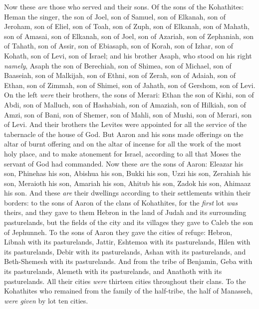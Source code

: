 \begin{biblechapter}
\verse Now these \textit{are} those who served and their sons. Of the sons of the Kohathites: Heman the singer, the son of Joel, son of Samuel,
\verse son of Elkanah, son of Jeroham, son of Eliel, son of Toah,
\verse son of Zuph, son of Elkanah, son of Mahath, son of Amasai,
\verse son of Elkanah, son of Joel, son of Azariah, son of Zephaniah,
\verse son of Tahath, son of Assir, son of Ebiasaph, son of Korah,
\verse son of Izhar, son of Kohath, son of Levi, son of Israel;
\verse and his brother Asaph, who stood on his right \textit{namely}, Asaph the son of Berechiah, son of Shimea,
\verse son of Michael, son of Baaseiah, son of Malkijah,
\verse son of Ethni, son of Zerah, son of Adaiah,
\verse son of Ethan, son of Zimmah, son of Shimei,
\verse son of Jahath, son of Gershom, son of Levi.
\verse On the left \textit{were} their brothers, the sons of Merari: Ethan the son of Kishi, son of Abdi, son of Malluch,
\verse son of Hashabiah, son of Amaziah, son of Hilkiah,
\verse son of Amzi, son of Bani, son of Shemer,
\verse son of Mahli, son of Mushi, son of Merari, son of Levi.
\verse And their brothers the Levites were appointed for all the service of the tabernacle of the house of God.
\verse But Aaron and his sons made offerings on the altar of burnt offering and on the altar of incense for all the work of the most holy place, and to make atonement for Israel, according to all that Moses the servant of God had commanded.
 Now these \textit{are} the sons of Aaron: Eleazar his son, Phinehas his son, Abishua his son,
\verse Bukki his son, Uzzi his son, Zerahiah his son,
\verse Meraioth his son, Amariah his son, Ahitub his son,
\verse Zadok his son, Ahimaaz his son.
\verse And these \textit{are} their dwellings according to their settlements within their borders: to the sons of Aaron of the clans of Kohathites, for the \textit{first} lot \textit{was} theirs,
\verse and they gave to them Hebron in the land of Judah and its surrounding pasturelands,
\verse but the fields of the city and its villages they gave to Caleb the son of Jephunneh.
\verse To the sons of Aaron they gave the cities of refuge: Hebron, Libnah with its pasturelands, Jattir, Eshtemoa with its pasturelands,
\verse Hilen with its pasturelands, Debir with its pasturelands,
\verse Ashan with its pasturelands, and Beth-Shemesh with its pasturelands.
\verse And from the tribe of Benjamin, Geba with its pasturelands, Alemeth with its pasturelands, and Anathoth with its pasturelands. All their cities \textit{were} thirteen cities throughout their clans.
\verse To the Kohathites who remained from the family of the half-tribe, the half of Manasseh, \textit{were given} by lot ten cities.

\end{biblechapter}
